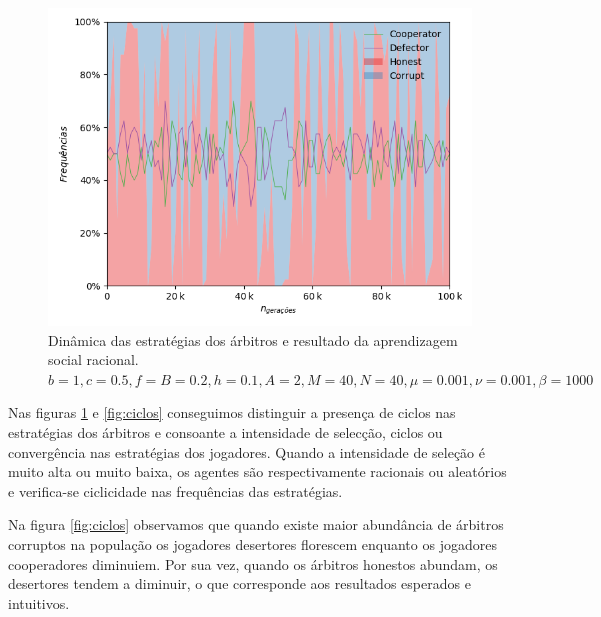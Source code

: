 \documentclass[conference, twocolumn]{IEEEtran}
\theoremstyle{plain}
\theoremstyle{definition}
\theoremstyle{remark}
\begin{document}
    \begin{figure}[h]
        \centering
        \includegraphics[width=1\linewidth]{images/AggregateComparison.png}
        \caption{\small Dinâmica das estratégias dos árbitros e resultado da aprendizagem social racional. $b=1, c=0.5, f=B=0.2, h=0.1, A=2, M=40, N=40, \mu=0.001, \nu=0.001, \beta=1000$}
        \label{fig:ciclos_agregados}
    \end{figure}

    Nas figuras \ref{fig:ciclos_agregados} e \ref{fig:ciclos} conseguimos distinguir a presença de ciclos nas estratégias dos árbitros e consoante a intensidade de selecção, ciclos ou convergência nas estratégias dos jogadores. Quando a intensidade de seleção é muito alta ou muito baixa, os agentes são respectivamente racionais ou aleatórios e verifica-se ciclicidade nas frequências das estratégias.

    Na figura \ref{fig:ciclos} observamos que quando existe maior abundância de árbitros corruptos na população os jogadores desertores florescem enquanto os jogadores cooperadores diminuiem. Por sua vez, quando os árbitros honestos abundam, os desertores tendem a diminuir, o que corresponde aos resultados esperados e intuitivos.
\end{document}
